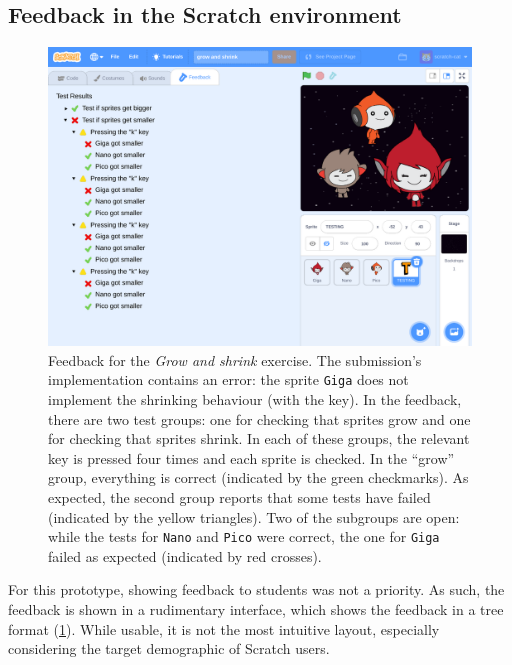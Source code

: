 \documentclass[../main]{subfiles}
\begin{document}
\subsection{Feedback in the Scratch environment}\label{subsec:feedback-in-the-scratch-environment}

\begin{figure}
    \begin{wide}
        \includegraphics[width=\linewidth]{scratch-poke-feedback}
    \end{wide}
    \caption{
        Feedback for the \emph{Grow and shrink} exercise.
        The submission's implementation contains an error: the sprite \texttt{Giga} does not implement the shrinking behaviour (with the  key).
        In the feedback, there are two test groups: one for checking that sprites grow and one for checking that sprites shrink.
        In each of these groups, the relevant key is pressed four times and each sprite is checked.
        In the ``grow'' group, everything is correct (indicated by the green checkmarks).
        As expected, the second group reports that some tests have failed (indicated by the yellow triangles).
        Two of the subgroups are open: while the tests for \texttt{Nano} and \texttt{Pico} were correct, the one for \texttt{Giga} failed as expected (indicated by red crosses).
    }
    \label{fig:poke-feedback-result}
\end{figure}

For this prototype, showing feedback to students was not a priority.
As such, the feedback is shown in a rudimentary interface, which shows the feedback in a tree format (\cref{fig:poke-feedback-result}).
While usable, it is not the most intuitive layout, especially considering the target demographic of Scratch users.
\end{document}

